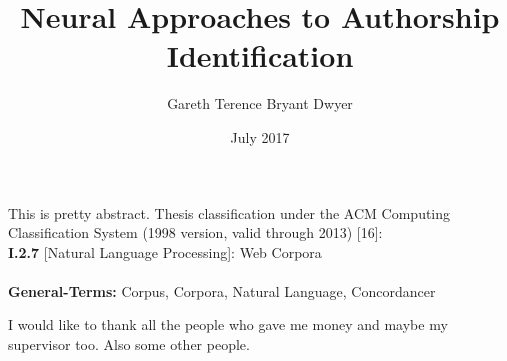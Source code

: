 \documentclass[12pt] {newrucsthesis}    %
\begin{document}



\title{ Neural Approaches to Authorship Identification }
\author{ Gareth Terence Bryant Dwyer}
\date { July 2017 }
\maketitle  

\abstract
This is pretty abstract.
\acm    %
Thesis classification under the ACM Computing Classification System (1998 version, valid
through 2013) [16]:\\
\textbf{I.2.7} [Natural Language Processing]: Web Corpora\\
\\
\textbf{General-Terms:} Corpus, Corpora, Natural Language, Concordancer


\ack
I would like to thank all the people who gave me money and maybe my supervisor too. Also some other people.

\newpage

\tableofcontents
\newpage

\listoffigures
\newpage

\listoftables
\newpage


% 
%


 
\end{document}
